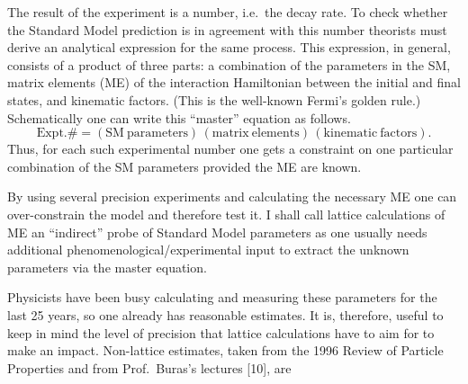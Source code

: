 The result of the experiment is a number, i.e.\ the decay rate. To check
whether the Standard Model prediction is in agreement with this number
theorists must derive an analytical expression for the same process. This
expression, in general, consists of a product of three parts: a combination
of the parameters in the SM, matrix elements (ME) of the interaction
Hamiltonian between the initial and final states, and kinematic factors.
(This is the well-known Fermi's golden rule.) Schematically one can write
this ``master'' equation as follows.
\begin{equation}
\mathrm{Expt.}\# =
(\mathrm{SM\ parameters})\,(\mathrm{matrix\ elements})\,(\mathrm{kinematic\ factors}).
\label{eq:master}
\end{equation}
Thus, for each such experimental number one gets a constraint on one
particular combination of the SM parameters provided the ME are known.

By using several precision experiments and calculating the necessary ME one
can over-constrain the model and therefore test it. I shall call lattice
calculations of ME an ``indirect'' probe of Standard Model parameters as
one usually needs additional phenomenological/experimental input to extract
the unknown parameters via the master equation.

Physicists have been busy calculating and measuring these parameters for
the last 25 years, so one already has reasonable estimates. It is,
therefore, useful to keep in mind the level of precision that lattice
calculations have to aim for to make an impact. Non-lattice estimates,
taken from the 1996 Review of Particle Properties and from Prof.~Buras's
lectures [10], are

